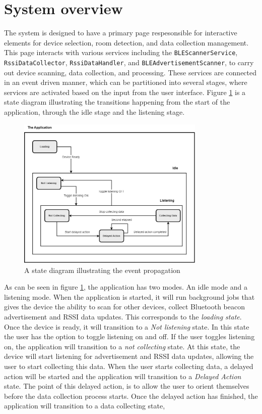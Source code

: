 \section{System overview}
The system is designed to have a primary page respesonsible for interactive elements for device selection, room detection, and data collection management. This page interacts with various services including the \texttt{BLEScannerService}, \texttt{RssiDataCollector}, \texttt{RssiDataHandler}, and \texttt{BLEAdvertisementScanner}, to carry out device scanning, data collection, and processing.
These services are connected in an event driven manner, which can be partitioned into several stages, where services are activated based on the input from the user interface. 
Figure \ref{fig:StateDiagram} is a state diagram illustrating the transitions happening from the start of the application, through the idle stage and the listening stage. 

\begin{figure}[H]
    \centering
    \includegraphics[width=0.8\textwidth]{images/BLE State diagram.drawio.png}
    \caption{A state diagram illustrating the event propagation}
    \label{fig:StateDiagram}
\end{figure}

As can be seen in figure \ref{fig:StateDiagram}, the application has two modes. 
An idle mode and a listening mode. 
When the application is started, it will run background jobs that gives the device the ability to scan for other devices, collect Bluetooth beacon advertisement and RSSI data updates. 
This corresponds to the \textit{loading state}.
Once the device is ready, it will transition to a \textit{Not listening} state. 
In this state the user has the option to toggle listening on and off. 
If the user toggles listening on, the application will transition to a \textit{not collecting} state.
At this state, the device will start listening for advertisement and RSSI data updates, allowing the user to start collecting this data.
When the user starts collecting data, a delayed action will be started and the application will transition to a \textit{Delayed Action} state.
The point of this delayed action, is to allow the user to orient themselves before the data collection process starts.
Once the delayed action has finished, the application will transition to a data collecting state, 

